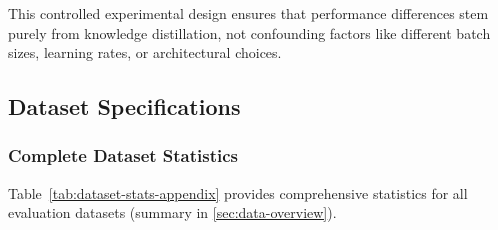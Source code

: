 This controlled experimental design ensures that performance differences stem purely from knowledge distillation, not confounding factors like different batch sizes, learning rates, or architectural choices.

\subsection{Dataset Specifications}
\label{app:datasets}

\subsubsection{Complete Dataset Statistics}
\label{app:dataset-stats}

Table~\ref{tab:dataset-stats-appendix} provides comprehensive statistics for all evaluation datasets (summary in \autoref{sec:data-overview}).

